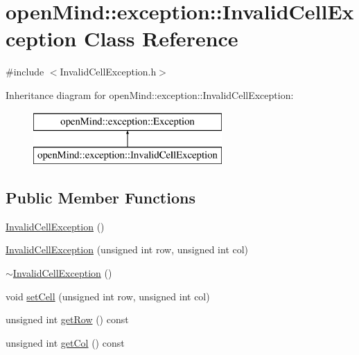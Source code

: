 \hypertarget{classopen_mind_1_1exception_1_1_invalid_cell_exception}{\section{open\+Mind\+:\+:exception\+:\+:Invalid\+Cell\+Exception Class Reference}
\label{classopen_mind_1_1exception_1_1_invalid_cell_exception}
}


{\ttfamily \#include $<$Invalid\+Cell\+Exception.\+h$>$}

Inheritance diagram for open\+Mind\+:\+:exception\+:\+:Invalid\+Cell\+Exception\+:\begin{figure}[H]
\begin{center}
\leavevmode
\includegraphics[height=2.000000cm]{classopen_mind_1_1exception_1_1_invalid_cell_exception}
\end{center}
\end{figure}
\subsection*{Public Member Functions}
\begin{DoxyCompactItemize}
\item 
\hyperlink{classopen_mind_1_1exception_1_1_invalid_cell_exception_a7c7c2a5bd0767b525778c6e3a0eb000e}{Invalid\+Cell\+Exception} ()
\item 
\hyperlink{classopen_mind_1_1exception_1_1_invalid_cell_exception_a6cf7e2862100426590fa810967529875}{Invalid\+Cell\+Exception} (unsigned int row, unsigned int col)
\item 
\hyperlink{classopen_mind_1_1exception_1_1_invalid_cell_exception_a5bc6d74da111cf553b8fa0489fd03826}{$\sim$\+Invalid\+Cell\+Exception} ()
\item 
void \hyperlink{classopen_mind_1_1exception_1_1_invalid_cell_exception_a3cfb8f5e6f0f701c14449ca328f0938e}{set\+Cell} (unsigned int row, unsigned int col)
\item 
unsigned int \hyperlink{classopen_mind_1_1exception_1_1_invalid_cell_exception_a93e875c71ae4b2b0bbcda3a50c339758}{get\+Row} () const 
\item 
unsigned int \hyperlink{classopen_mind_1_1exception_1_1_invalid_cell_exception_aa705dbfe24bd7d41d1fc775f489e5f4d}{get\+Col} () const 
\end{DoxyCompactItemize}


